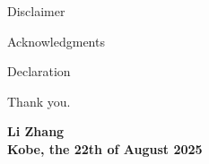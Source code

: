 \begin{abstractpage}{Disclaimer}


\end{abstractpage}
\begin{abstractpage}{Acknowledgments}


\end{abstractpage}
\begin{abstractpage}{Declaration}

Thank you.

\par\bigskip
\par\bigskip

\begin{flushright}
\par\bigskip
\textbf{Li Zhang}\\
\textbf{Kobe, the 22th of August 2025}
\end{flushright}
\end{abstractpage}
